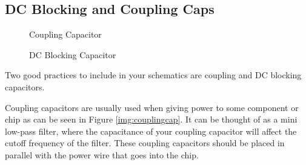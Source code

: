 \subsection{DC Blocking and Coupling Caps}
\begin{figure}[H]
  \begin{minipage}{0.5\textwidth}
    \centering
    \caption{Coupling Capacitor}
    \label{img:couplingcap}
  \end{minipage}
  \begin{minipage}{0.5\textwidth}
    \centering
    \caption{DC Blocking Capacitor}
    \label{img:dcblockingcap}
  \end{minipage}
\end{figure}

Two good practices to include in your schematics are coupling and DC blocking capacitors. 

Coupling capacitors are usually used when giving power to some component or chip as can be seen in Figure \ref{img:couplingcap}. It 
can be thought of as a mini low-pass filter, where the capacitance of your coupling capacitor will affect the 
cutoff frequency of the filter. These coupling capacitors should be placed in parallel with the power wire that goes into the chip.

